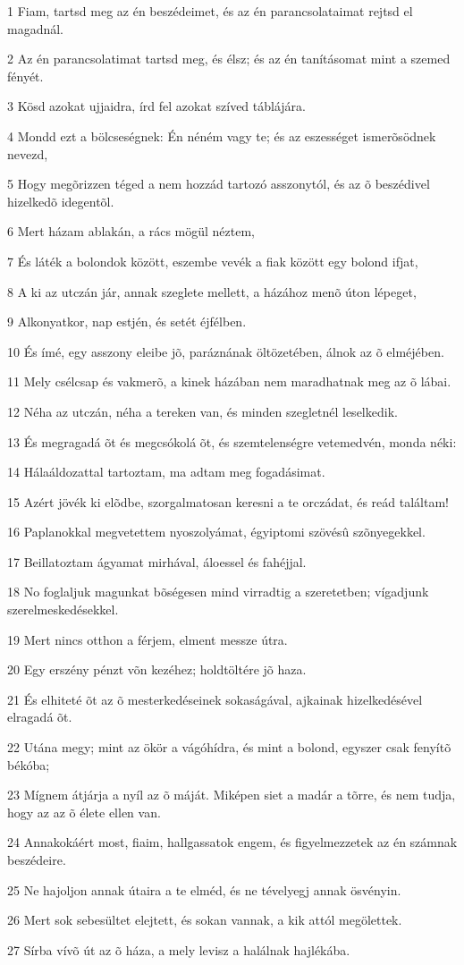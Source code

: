 \par 1 Fiam, tartsd meg az én beszédeimet, és az én parancsolataimat rejtsd el magadnál.
\par 2 Az én parancsolatimat tartsd meg, és élsz; és az én tanításomat mint a szemed fényét.
\par 3 Kösd azokat ujjaidra, írd fel azokat szíved táblájára.
\par 4 Mondd ezt a bölcseségnek: Én néném vagy te; és az eszességet ismerõsödnek nevezd,
\par 5 Hogy megõrizzen téged a nem hozzád tartozó asszonytól, és az õ beszédivel hizelkedõ idegentõl.
\par 6 Mert házam ablakán, a rács mögül néztem,
\par 7 És láték a bolondok között, eszembe vevék a fiak között egy bolond ifjat,
\par 8 A ki az utczán jár, annak szeglete mellett, a házához menõ úton lépeget,
\par 9 Alkonyatkor, nap estjén, és setét éjfélben.
\par 10 És ímé, egy asszony eleibe jõ, paráznának öltözetében, álnok az õ elméjében.
\par 11 Mely csélcsap és vakmerõ, a kinek házában nem maradhatnak meg az õ lábai.
\par 12 Néha az utczán, néha a tereken van, és minden szegletnél leselkedik.
\par 13 És megragadá õt és megcsókolá õt, és szemtelenségre vetemedvén, monda néki:
\par 14 Hálaáldozattal tartoztam, ma adtam meg fogadásimat.
\par 15 Azért jövék ki elõdbe, szorgalmatosan keresni a te orczádat, és reád találtam!
\par 16 Paplanokkal megvetettem nyoszolyámat, égyiptomi szövésû szõnyegekkel.
\par 17 Beillatoztam ágyamat mirhával, áloessel és fahéjjal.
\par 18 No foglaljuk magunkat bõségesen mind virradtig a szeretetben; vígadjunk szerelmeskedésekkel.
\par 19 Mert nincs otthon a férjem, elment messze útra.
\par 20 Egy erszény pénzt võn kezéhez; holdtöltére jõ haza.
\par 21 És elhiteté õt az õ mesterkedéseinek sokaságával, ajkainak hizelkedésével elragadá õt.
\par 22 Utána megy; mint az ökör a vágóhídra, és mint a bolond, egyszer csak fenyítõ békóba;
\par 23 Mígnem átjárja a nyíl az õ máját. Miképen siet a madár a tõrre, és nem tudja, hogy az az õ élete ellen van.
\par 24 Annakokáért most, fiaim, hallgassatok engem, és figyelmezzetek az én számnak beszédeire.
\par 25 Ne hajoljon annak útaira a te elméd, és ne tévelyegj annak ösvényin.
\par 26 Mert sok sebesültet elejtett, és sokan vannak, a kik attól megölettek.
\par 27 Sírba vívõ út az õ háza, a mely levisz a halálnak hajlékába.

